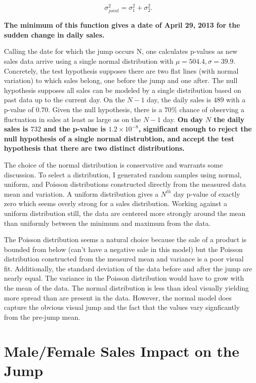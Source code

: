 \documentclass{article}[12pt]
\begin{document}
\begin{equation}
\sigma_{joint}^2 = \sigma_1^2 + \sigma_2^2.
\end{equation}

\noindent
{\bf The minimum of this function gives a date of April 29, 2013 for the sudden change in
daily sales.}

Calling the date for which the jump occurs N, one calculates p-values as new
 sales data arrive using a single normal distribution with
 $\mu=504.4,\sigma=39.9$. Concretely, the test hypothesis supposes there are 
two flat lines (with normal variation) to which sales belong, one before the jump and one after.
 The null hypothesis supposes all sales can be modeled by a single distribution
based on past data up to the current day. On the $N-1$ day, the daily sales is $489$ with a p-value of $0.70$. Given the null hypothesis, there is a $70\%$ chance
 of observing a fluctuation in sales at least as large as on the $N-1$ day.
 {\bf On day $N$ the daily sales is $732$ and the p-value is $1.2\times10^{-8}$, significant enough to reject the null hypothesis of a single normal distrubtion, and 
accept the test hypothesis that there are two distinct distributions.}

The choice of the normal distribution is conservative and warrants some discussion.
To select a distribution, I generated random samples
using normal, uniform, and Poisson distributions constructed directly from the measured data mean and variation. A uniform distribution gives
 a $N^{th}$ day p-value of exactly zero which seems overly strong for a sales distribution. Working against a uniform distribution still, the data are centered more strongly around the mean than uniformly between the minimum and maximum from the data.

 The Poisson distribution seems a natural choice because the sale of a product is
bounded from below (can't have a  negative sale in this model) but the Poisson distribution constructed from the measured mean and variance is a poor visual fit.
Additionally, the standard deviation of the data before and after the jump are nearly
equal. The variance in the Poisson distribution would have to grow with the mean of the data. The normal distribution is less than ideal visually yielding more spread than are present in the data. However, the normal model does capture the obvious visual jump and the fact that the values vary signficantly from the pre-jump mean.

\section{Male/Female Sales Impact on the Jump}
\end{document}
